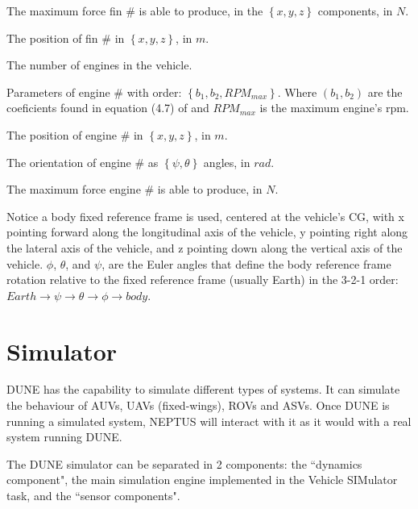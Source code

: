 \documentclass[10pt,a4paper]{article}
\begin{document}
\begin{description}[leftmargin=19em,style=nextline]
\item[Fin Force \#]	The maximum force fin \# is able to produce, in the $\left\{x, y, z\right\}$ components, in $N$.

\item[Fin Position \#] The position of fin \# in $\left\{x, y, z\right\}$, in $m$.

\item[Engine Count] The number of engines in the vehicle.

\item[Engine Parameters \#] Parameters of engine \# with order: $\left\{b_1, b_2, RPM_{max}\right\}$. Where $\left(b_1, b_2\right)$ are the coeficients found in equation (4.7) of \cite{fossen} and $RPM_{max}$ is the maximum engine's rpm.

\item[Engine Position \#] The position of engine \# in $\left\{x, y, z\right\}$, in $m$.

\item[Engine Orientation \#] The orientation of engine \# as $\left\{\psi, \theta\right\}$ angles, in $rad$.

\item[Engine Max Force] The maximum force engine \# is able to produce, in $N$.

\end{description}

Notice a body fixed reference frame is used, centered at the vehicle's CG, with x pointing forward along the longitudinal axis of the vehicle, y pointing right along the lateral axis of the vehicle, and z pointing down along the vertical axis of the vehicle. $\phi$, $\theta$, and $\psi$, are the Euler angles that define the body reference frame rotation relative to the fixed reference frame (usually Earth) in the 3-2-1 order: $Earth \rightarrow \psi \rightarrow \theta \rightarrow \phi \rightarrow body$.

\section{Simulator}
\par DUNE has the capability to simulate different types of systems. It can simulate the behaviour of AUVs, UAVs (fixed-wings), ROVs and ASVs. Once DUNE is running a simulated system, NEPTUS will interact with it as it would with a real system running DUNE.

\par The DUNE simulator can be separated in 2 components: the ``dynamics component", the main simulation engine implemented in the Vehicle SIMulator task, and the ``sensor components". 
\end{document}
